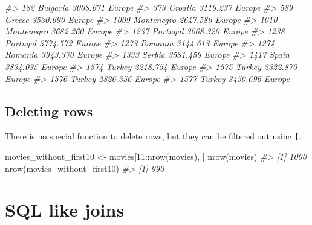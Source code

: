 \documentclass[
]{book}
\newenvironment{Shaded}{\begin{snugshade}}{\end{snugshade}}
\newcommand{\CommentTok}[1]{\textcolor[rgb]{0.56,0.35,0.01}{\textit{#1}}}
\newcommand{\DecValTok}[1]{\textcolor[rgb]{0.00,0.00,0.81}{#1}}
\newcommand{\FunctionTok}[1]{\textcolor[rgb]{0.00,0.00,0.00}{#1}}
\newcommand{\NormalTok}[1]{#1}
\newcommand{\OtherTok}[1]{\textcolor[rgb]{0.56,0.35,0.01}{#1}}
\newcommand{\SpecialCharTok}[1]{\textcolor[rgb]{0.00,0.00,0.00}{#1}}
\begin{document}
\begin{Shaded}
\begin{Highlighting}[]
\CommentTok{\#\textgreater{} 182                Bulgaria  3008.671    Europe}
\CommentTok{\#\textgreater{} 373                 Croatia  3119.237    Europe}
\CommentTok{\#\textgreater{} 589                  Greece  3530.690    Europe}
\CommentTok{\#\textgreater{} 1009             Montenegro  2647.586    Europe}
\CommentTok{\#\textgreater{} 1010             Montenegro  3682.260    Europe}
\CommentTok{\#\textgreater{} 1237               Portugal  3068.320    Europe}
\CommentTok{\#\textgreater{} 1238               Portugal  3774.572    Europe}
\CommentTok{\#\textgreater{} 1273                Romania  3144.613    Europe}
\CommentTok{\#\textgreater{} 1274                Romania  3943.370    Europe}
\CommentTok{\#\textgreater{} 1333                 Serbia  3581.459    Europe}
\CommentTok{\#\textgreater{} 1417                  Spain  3834.035    Europe}
\CommentTok{\#\textgreater{} 1574                 Turkey  2218.754    Europe}
\CommentTok{\#\textgreater{} 1575                 Turkey  2322.870    Europe}
\CommentTok{\#\textgreater{} 1576                 Turkey  2826.356    Europe}
\CommentTok{\#\textgreater{} 1577                 Turkey  3450.696    Europe}
\end{Highlighting}
\end{Shaded}

\hypertarget{deleting-rows}{%
\subsection{Deleting rows}\label{deleting-rows}}

There is no special function to delete rows, but they can be filtered out using \texttt{{[}}.

\begin{Shaded}
\begin{Highlighting}[]
\NormalTok{movies\_without\_first10 }\OtherTok{\textless{}{-}}\NormalTok{ movies[}\DecValTok{11}\SpecialCharTok{:}\FunctionTok{nrow}\NormalTok{(movies), ]}
\FunctionTok{nrow}\NormalTok{(movies)}
\CommentTok{\#\textgreater{} [1] 1000}
\FunctionTok{nrow}\NormalTok{(movies\_without\_first10)}
\CommentTok{\#\textgreater{} [1] 990}
\end{Highlighting}
\end{Shaded}

\hypertarget{br-joins}{%
\section{SQL like joins}\label{br-joins}}
\end{document}
